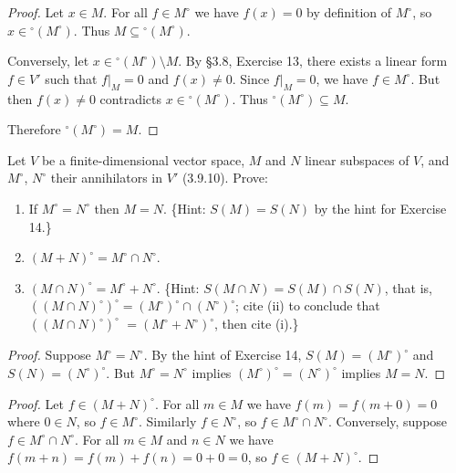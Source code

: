 \begin{proof}
    Let $x \in M$. For all $f \in M^\circ$ we have $f(x) = 0$ by definition
    of $M^\circ$, so $x \in {}^\circ(M^\circ)$. Thus $M \subseteq {}^\circ(M^\circ)$.

    Conversely, let $x \in {}^\circ(M^\circ) \setminus M$.
    By \S 3.8, Exercise 13, there exists a linear form $f \in V'$ such that
    $f|_M = 0$ and $f(x) \ne 0$.
    Since $f|_M = 0$, we have $f \in M^\circ$.
    But then $f(x) \ne 0$ contradicts $x \in {}^\circ(M^\circ)$.
    Thus ${}^\circ(M^\circ) \subseteq M$.

    Therefore ${}^\circ(M^\circ) = M$.
\end{proof}

\begin{tcolorbox}[title=Exercise 15, breakable]
    Let $V$ be a finite-dimensional vector space, $M$ and $N$ linear subspaces 
    of $V$, and $M^\circ$, $N^\circ$ their annihilators in $V'$ (3.9.10). Prove:
    \begin{enumerate}
        \item[(i)] If $M^\circ = N^\circ$ then $M = N$. \{Hint: $S(M) = S(N)$ by the hint for 
        Exercise 14.\}
        \item[(ii)] $(M + N)^\circ = M^\circ \cap N^\circ$.
        \item[(iii)] $(M \cap N)^\circ = M^\circ + N^\circ$. \{Hint: $S(M \cap N) = S(M) \cap S(N)$, that is, 
        $((M \cap N)^\circ)^\circ = (M^\circ)^\circ \cap (N^\circ)^\circ$; cite (ii) to conclude that $((M \cap N)^\circ)^\circ$ 
        $= (M^\circ + N^\circ)^\circ$, then cite (i).\}
    \end{enumerate}
\end{tcolorbox}

\begin{proof}
    Suppose $M^\circ = N^\circ$.
    By the hint of Exercise 14, $S(M) = (M^\circ)^\circ$ and $S(N) = (N^\circ)^\circ$.
    But $M^\circ = N^\circ$ implies $(M^\circ)^\circ = (N^\circ)^\circ$ implies $M = N$.
\end{proof}

\begin{proof}
    Let $f \in (M + N)^\circ$.
    For all $m \in M$ we have $f(m) = f(m + 0) = 0$ where $0 \in N$,
    so $f \in M^\circ$. Similarly $f \in N^\circ$, so $f \in M^\circ \cap N^\circ$.
    Conversely, suppose $f \in M^\circ \cap N^\circ$.
    For all $m \in M$ and $n \in N$ we have $f(m + n) = f(m) + f(n) = 0 + 0 = 0$,
    so $f \in (M + N)^\circ$.
\end{proof}

